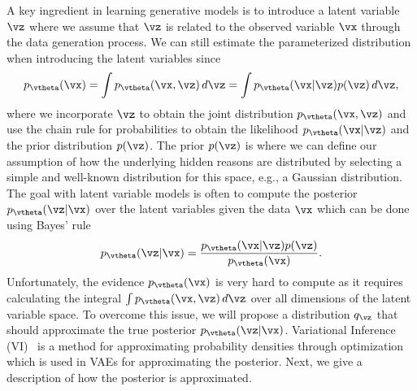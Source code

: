 A key ingredient in learning generative models is to introduce a latent variable $\vz$ where we assume that $\vz$ is related to the observed variable $\vx$ through the data generation process. We can still estimate the parameterized distribution when introducing the latent variables since
\begin{align}\label{eq:marginal_density}
	p_{\vtheta}(\vx) = \int p_{\vtheta}(\vx, \vz) \,d\vz = \int p_{\vtheta}(\vx | \vz) p(\vz) \,d\vz,
\end{align}
where we incorporate $\vz$ to obtain the joint distribution $p_{\vtheta}(\vx, \vz)$ and use the chain rule for probabilities to obtain the likelihood $p_{\vtheta}(\vx | \vz)$ and the prior distribution $p(\vz)$. The prior $p(\vz)$ is where we can define our assumption of how the underlying hidden reasons are distributed by selecting a simple and well-known distribution for this space, e.g., a Gaussian distribution. The goal with latent variable models is often to compute the posterior $p_{\vtheta}(\vz | \vx)$ over the latent variables given the data $\vx$ which can be done using Bayes' rule 
\begin{align}
	p_{\vtheta}(\vz | \vx) = \frac{p_{\vtheta}(\vx | \vz) p(\vz)}{p_{\vtheta}(\vx)}. 
\end{align}
Unfortunately, the evidence $p_{\vtheta}(\vx)$ is very hard to compute as it requires calculating the integral $\int p_{\vtheta}(\vx, \vz) \,d\vz$ over all dimensions of the latent variable space. To overcome this issue, we will propose a distribution $q_{\vz}$ that should approximate the true posterior $p_{\vtheta}(\vz | \vx)$. Variational Inference (VI)~\cite{blei2017variational, zhang2018advances} is a method for approximating probability densities through optimization which is used in VAEs for approximating the posterior. Next, we give a description of how the posterior is approximated.

